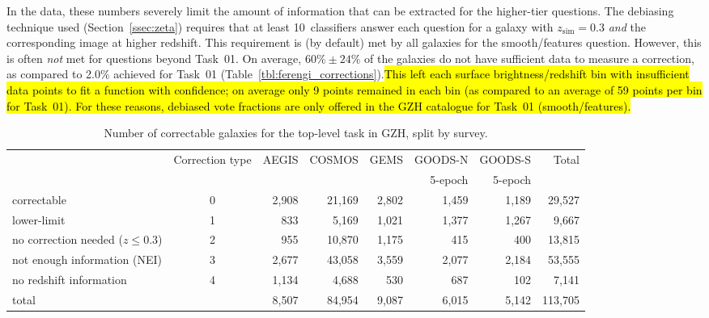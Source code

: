 \documentclass[a4paper,fleqn,usenatbib]{mnras}
\begin{document}
In the \ferengi{} data, these numbers severely limit the amount of information
that can be extracted for the higher-tier questions. The debiasing technique
used (Section~\ref{ssec:zeta}) requires that at least 10~classifiers answer each
question for a galaxy with $z_\mathrm{sim}=0.3$ \emph{and} the corresponding
image at higher redshift. This requirement is (by default) met by all galaxies
for the smooth/features question. However, this is often \emph{not} met for
questions beyond Task~01. On average, $60\%\pm24\%$ of the galaxies do not have
sufficient data to measure a correction, as compared to 2.0\% achieved for
Task~01 (Table~\ref{tbl:ferengi_corrections}).\hl{This left each surface brightness/redshift bin 
with insufficient data points to fit a function with confidence; on average only 9 points
remained in each bin (as compared to an average of 59 points per bin for Task~01). For these reasons,
debiased vote fractions are only offered in the GZH catalogue for Task~01
(smooth/features).  }

\begin{table}
\caption{Number of correctable galaxies for the top-level task in GZH, split by \hst{} survey.}\label{tbl:hubble_debiasable}
\begin{tabular}{lcrrrrr|r}
\hline\hline
                                   & Correction type & AEGIS   & COSMOS & GEMS  & GOODS-N & GOODS-S  &  Total  \\
                                   &                 &         &        &       & 5-epoch & 5-epoch  &         \\
\hline
correctable                        & 0               & 2,908   & 21,169 & 2,802 & 1,459   & 1,189    &  29,527 \\
lower-limit                        & 1               &   833   &  5,169 & 1,021 & 1,377   & 1,267    &   9,667 \\
no correction needed ($z \le 0.3$) & 2               &   955   & 10,870 & 1,175 &   415   &   400    &  13,815 \\ 
not enough information (NEI)       & 3               & 2,677   & 43,058 & 3,559 & 2,077   & 2,184    &  53,555 \\
no redshift information            & 4               & 1,134   &  4,688 &   530 &   687   &   102    &   7,141 \\
\hline
total                              &                 & 8,507   & 84,954 & 9,087 & 6,015   & 5,142    & 113,705 \\
\hline\hline
\end{tabular}
\end{table}
\end{document}
